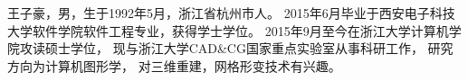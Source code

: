 \begin{resume}
王子豪，男，生于1992年5月，浙江省杭州市人。
2015年6月毕业于西安电子科技大学软件学院软件工程专业，获得学士学位。
2015年9月至今在浙江大学计算机学院攻读硕士学位，
现与浙江大学CAD\&CG国家重点实验室从事科研工作，
研究方向为计算机图形学，
对三维重建，网格形变技术有兴趣。
\end{resume}
